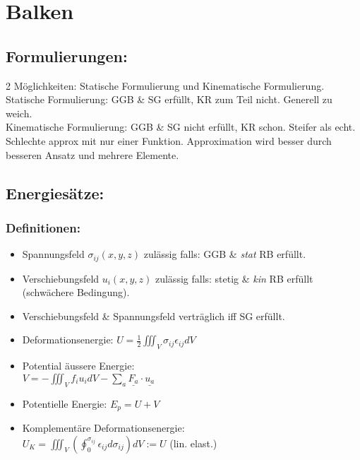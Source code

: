 \section{Balken}
    \subsection{Formulierungen:}
        2 Möglichkeiten: Statische Formulierung und Kinematische Formulierung.\\
        Statische Formulierung: GGB \& SG erfüllt, KR zum Teil nicht. Generell zu weich.\\
        Kinematische Formulierung: GGB \& SG nicht erfüllt, KR schon. Steifer als echt. Schlechte approx mit nur einer Funktion. Approximation wird besser durch besseren Ansatz und mehrere Elemente.
    \subsection{Energiesätze:}
        \subsubsection{Definitionen:}
            \begin{itemize}
                \item Spannungsfeld $\sigma_{ij}(x,y,z)$ zulässig falls: GGB \& \textit{stat} RB erfüllt.
                \item Verschiebungsfeld $u_i(x,y,z)$ zulässig falls: stetig \& \textit{kin} RB erfüllt (schwächere Bedingung).
                \item Verschiebungsfeld \& Spannungsfeld verträglich iff SG erfüllt.
                \item Deformationsenergie: $\displaystyle U=\frac{1}{2}\iiint_V \sigma_{ij}\epsilon_{ij}dV$
                \item Potential äussere Energie:\\
                $\displaystyle V=-\iiint_V f_iu_idV-\sum_{a}\underline{F_a}\cdot\underline{u_a}$ 
                \item Potentielle Energie: $E_p=U+V$
                \item Komplementäre Deformationsenergie:\\ $U_K=\iiint_V(\oint_0^{\sigma_{ij}}\epsilon_{ij}d\sigma_{ij})dV := U$  (lin. elast.)
            \end{itemize}
            
